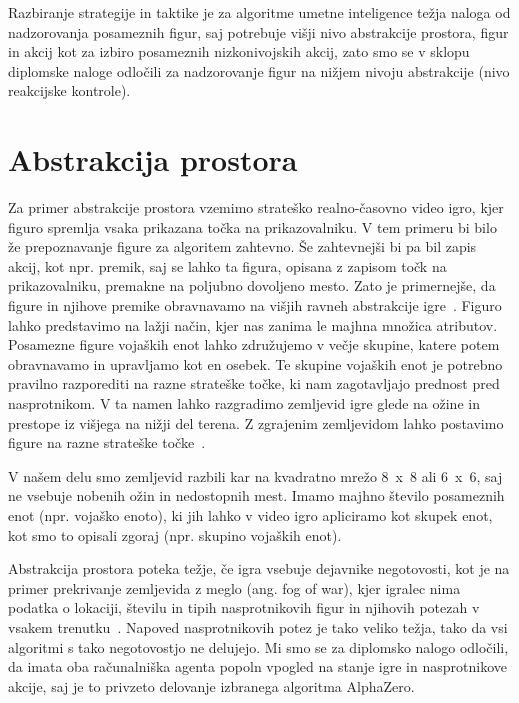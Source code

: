 \documentclass[a4paper, 12pt]{book}
\begin{document}
Razbiranje strategije in taktike je za algoritme umetne inteligence težja naloga od nadzorovanja posameznih figur, saj potrebuje višji nivo abstrakcije prostora, figur in akcij kot za izbiro posameznih nizkonivojskih akcij, zato smo se v sklopu diplomske naloge odločili za nadzorovanje figur na nižjem nivoju abstrakcije (nivo reakcijske kontrole).

\section{Abstrakcija prostora}
Za primer abstrakcije prostora vzemimo strateško realno-časovno video igro, kjer figuro spremlja vsaka prikazana točka na prikazovalniku.
V tem primeru bi bilo že prepoznavanje figure za algoritem zahtevno. 
Še zahtevnejši bi pa bil zapis akcij, kot npr. premik, saj se lahko ta figura, opisana z zapisom točk na prikazovalniku, premakne na poljubno dovoljeno mesto.
Zato je primernejše, da figure in njihove premike obravnavamo na višjih ravneh abstrakcije igre~\cite{uriarte2015automatic}.
Figuro lahko predstavimo na lažji način, kjer nas zanima le majhna množica atributov.
Posamezne figure vojaških enot lahko združujemo v večje skupine, katere potem obravnavamo in upravljamo kot en osebek.
Te skupine vojaških enot je potrebno pravilno razporediti na razne strateške točke, ki nam zagotavljajo prednost pred nasprotnikom.
V ta namen lahko razgradimo zemljevid igre glede na ožine in prestope iz višjega na nižji del terena.
Z zgrajenim zemljevidom lahko postavimo figure na razne strateške točke~\cite{uriarte2014game}.

V našem delu smo zemljevid razbili kar na kvadratno mrežo 8~x~8 ali 6~x~6, saj ne vsebuje nobenih ožin in nedostopnih mest.
Imamo majhno število posameznih enot (npr. vojaško enoto), ki jih lahko v video igro apliciramo kot skupek enot, kot smo to opisali zgoraj (npr. skupino vojaških enot).

Abstrakcija prostora poteka težje, če igra vsebuje dejavnike negotovosti, kot je na primer prekrivanje zemljevida z meglo (ang. fog of war), kjer igralec nima podatka o lokaciji, številu in tipih nasprotnikovih figur in njihovih potezah v vsakem trenutku~{\cite{ciancarini2010monte}}. 
Napoved nasprotnikovih potez je tako veliko težja, tako da vsi algoritmi s tako negotovostjo ne delujejo.
Mi smo se za diplomsko nalogo odločili, da imata oba računalniška agenta popoln vpogled na stanje igre in nasprotnikove akcije, saj je to privzeto delovanje izbranega algoritma AlphaZero.
\end{document}
